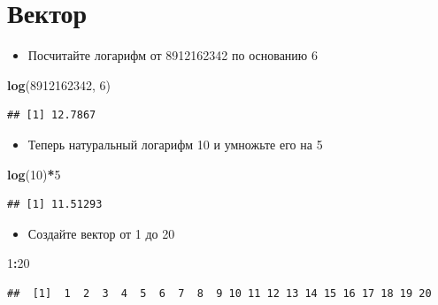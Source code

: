 \documentclass[]{book}
\newenvironment{Shaded}{\begin{snugshade}}{\end{snugshade}}
\newcommand{\DecValTok}[1]{\textcolor[rgb]{0.00,0.00,0.81}{#1}}
\newcommand{\KeywordTok}[1]{\textcolor[rgb]{0.13,0.29,0.53}{\textbf{#1}}}
\newcommand{\NormalTok}[1]{#1}
\newcommand{\OperatorTok}[1]{\textcolor[rgb]{0.81,0.36,0.00}{\textbf{#1}}}
\providecommand{\tightlist}{%
  \setlength{\itemsep}{0pt}\setlength{\parskip}{0pt}}
\begin{document}
\hypertarget{solvvec_task_1}{%
\section{Вектор}\label{solvvec_task_1}}

\begin{itemize}
\tightlist
\item
  Посчитайте логарифм от 8912162342 по основанию 6
\end{itemize}

\begin{Shaded}
\begin{Highlighting}[]
\KeywordTok{log}\NormalTok{(}\DecValTok{8912162342}\NormalTok{, }\DecValTok{6}\NormalTok{)}
\end{Highlighting}
\end{Shaded}

\begin{verbatim}
## [1] 12.7867
\end{verbatim}

\begin{itemize}
\tightlist
\item
  Теперь натуральный логарифм 10 и умножьте его на 5
\end{itemize}

\begin{Shaded}
\begin{Highlighting}[]
\KeywordTok{log}\NormalTok{(}\DecValTok{10}\NormalTok{)}\OperatorTok{*}\DecValTok{5}
\end{Highlighting}
\end{Shaded}

\begin{verbatim}
## [1] 11.51293
\end{verbatim}

\begin{itemize}
\tightlist
\item
  Создайте вектор от 1 до 20
\end{itemize}

\begin{Shaded}
\begin{Highlighting}[]
\DecValTok{1}\OperatorTok{:}\DecValTok{20}
\end{Highlighting}
\end{Shaded}

\begin{verbatim}
##  [1]  1  2  3  4  5  6  7  8  9 10 11 12 13 14 15 16 17 18 19 20
\end{verbatim}
\end{document}
